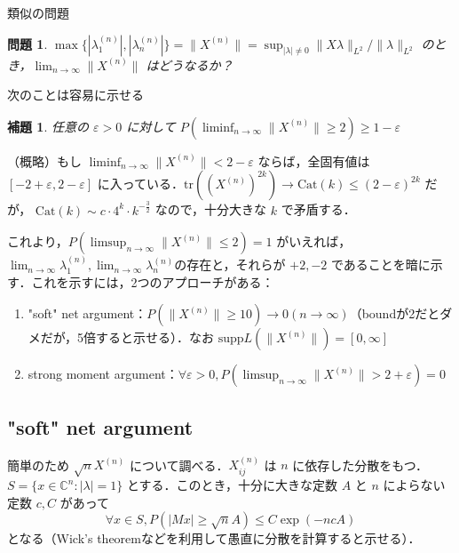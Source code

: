 \documentclass{ltjsarticle}
\makeatletter
\theoremstyle{mystyle1}
\newtheorem{lem}[dfn]{補題}
\theoremstyle{mystyle2}
\newtheorem{qes}{問題}
\theoremstyle{mystyle3}
\renewenvironment{proof}[1][\proofname]{\par
  \pushQED{\qed}%
  \normalfont
  \topsep6\p@\@plus6\p@ \trivlist
  \item[\hskip\labelsep{\bfseries\sffamily #1}]\ignorespaces
}{%
  \popQED\endtrivlist\@endpefalse
}
\renewcommand\proofname{証明}
\makeatother
\begin{document}
類似の問題

\begin{qes}
    $\max\{|\lambda_1^{(n)}|,|\lambda_n^{(n)}|\}=\|X^{(n)}\|=\sup_{|\lambda|\neq 0}\|X\lambda\|_{L^2}/\|\lambda\|_{L^2}$ のとき，$\lim_{n\to\infty}\|X^{(n)}\|$ はどうなるか？
\end{qes}

次のことは容易に示せる

\begin{lem}
    任意の $\varepsilon>0$ に対して $P(\liminf_{n\to\infty}\|X^{(n)}\|\geq 2)\geq 1-\varepsilon$
\end{lem}

\begin{proof}
    （概略）もし $\liminf_{n\to\infty}\|X^{(n)}\|<2-\varepsilon$ ならば，全固有値は $[-2+\varepsilon,2-\varepsilon]$ に入っている．$\mathrm{tr}((X^{(n)})^{2k})\to\mathrm{Cat}(k)\leq (2-\varepsilon)^{2k}$ だが， $\mathrm{Cat}(k)\sim c\cdot 4^k\cdot k^{-\frac{3}{2}}$ なので，十分大きな $k$ で矛盾する．
\end{proof}

これより，$P(\limsup_{n\to\infty}\|X^{(n)}\|\leq 2)=1$ がいえれば，$\lim_{n\to\infty}\lambda_1^{(n)},\lim_{n\to\infty}\lambda_n^{(n)}$の存在と，それらが $+2,-2$ であることを暗に示す．これを示すには，2つのアプローチがある：

\begin{enumerate}
    \item "soft" net argument：$P(\|X^{(n)}\|\geq 10)\to 0 (n\to\infty)$（boundが2だとダメだが，5倍すると示せる）．なお $\mathrm{supp} L(\|X^{(n)}\|)=[0,\infty]$
    \item strong moment argument：$\forall\varepsilon>0,P(\limsup_{n\to\infty}\|X^{(n)}\|>2+\varepsilon)=0$
\end{enumerate}

\subsection{"soft" net argument}

簡単のため $\sqrt{n}X^{(n)}$ について調べる．$X_{ij}^{(n)}$ は $n$ に依存した分散をもつ．$S=\{x\in\mathbb{C}^n:|\lambda|=1\}$ とする．このとき，十分に大きな定数 $A$ と $n$ によらない定数 $c,C$ があって
\begin{equation}
    \forall x\in S,P(|Mx|\geq \sqrt{n}A)\leq C\exp(-ncA)\tag{*}
\end{equation}
となる（Wick's theoremなどを利用して愚直に分散を計算すると示せる）．
\end{document}
